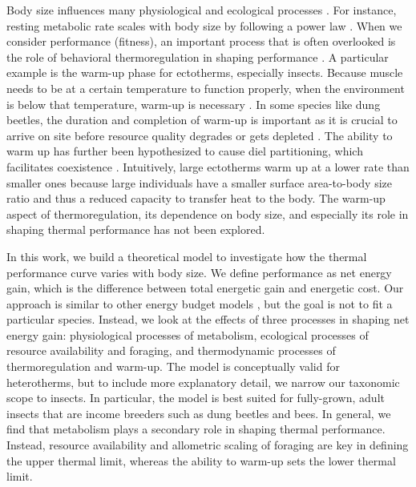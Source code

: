 Body size influences many physiological and ecological processes \citep{Peters1986}.
For instance, resting metabolic rate scales with body size by following a power law \citep{Kleiber1947, Peters1986, Gillooly2001,Brown2004}.
When we consider performance (fitness), an important process that is often overlooked is the role of behavioral thermoregulation in shaping performance \citep{Kearney2009b}.
A particular example is the warm-up phase for ectotherms, especially insects.
Because muscle needs to be at a certain temperature to function properly, when the environment is below that temperature, warm-up is necessary \citep[e.g.,][]{Heinrich1975}.
In some species like dung beetles, the duration and completion of warm-up is important as it is crucial to arrive on site before resource quality degrades or gets depleted \citep{Hanski1991}. %
The ability to warm up has further been hypothesized to cause diel partitioning, which facilitates coexistence \citep{Viljanen2009}.
Intuitively, large ectotherms warm up at a lower rate than smaller ones because large individuals have a smaller surface area-to-body size ratio and thus a reduced capacity to transfer heat to the body.
The warm-up aspect of thermoregulation, its dependence on body size, and especially its role in shaping thermal performance has not been explored.

In this work, we build a theoretical model to investigate how the thermal performance curve varies with body size.
We define performance as net energy gain, which is the difference between total energetic gain and energetic cost.
Our approach is similar to other energy budget models \citep[e.g.,][]{Kooijman2009}, but the goal is not to fit a particular species.
Instead, we look at the effects of three processes in shaping net energy gain: physiological processes of metabolism, ecological processes of resource availability and foraging, and thermodynamic processes of thermoregulation and warm-up.  %
The model is conceptually valid for heterotherms, but to include more explanatory detail, we narrow our taxonomic scope to insects.
In particular, the model is best suited for fully-grown, adult insects that are income breeders such as dung beetles and bees.
In general, we find that metabolism plays a secondary role in shaping thermal performance.
Instead, resource availability and allometric scaling of foraging are key in defining the upper thermal limit, whereas the ability to warm-up sets the lower thermal limit.
